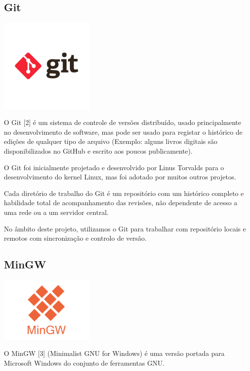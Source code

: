 \documentclass[a4paper,12pt]{article}
\begin{document}
\subsection{Git}
    \includegraphics[width=0.35\textwidth]{git.png} %
    \vspace{0.5cm}

O Git [2] é um sistema de controle de versões distribuído, usado principalmente no desenvolvimento de software, mas pode ser usado para registar o histórico de edições de qualquer tipo de arquivo (Exemplo: alguns livros digitais são disponibilizados no GitHub e escrito aos poucos publicamente).

O Git foi inicialmente projetado e desenvolvido por Linus Torvalds para o desenvolvimento do kernel Linux, mas foi adotado por muitos outros projetos.

Cada diretório de trabalho do Git é um repositório com um histórico completo e habilidade total de acompanhamento das revisões, não dependente de acesso a uma rede ou a um servidor central.

No âmbito deste projeto, utilizamos o Git para trabalhar com repositório locais e remotos com sincronização e controlo de versão.

\subsection{MinGW}
    \includegraphics[width=0.35\textwidth]{mingw.png} %
    \vspace{0.5cm}

O MinGW [3] (Minimalist GNU for Windows) é uma versão portada para Microsoft Windows do conjunto de ferramentas GNU. 
\end{document}
